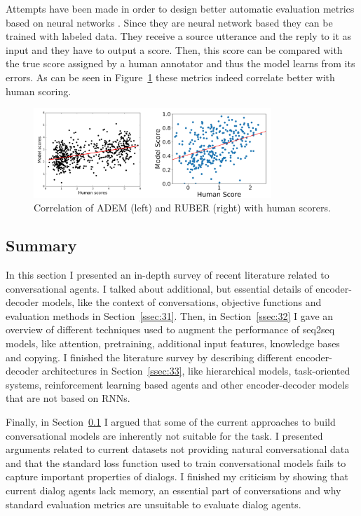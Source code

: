 \documentclass[12pt]{article}
\begin{document}
Attempts have been made in order to design better automatic evaluation metrics based on neural networks \cite{Tao:2017,Lowe:2017,Li_adversarial:2017}. Since they are neural network based they can be trained with labeled data. They receive a source utterance and the reply to it as input and they have to output a score. Then, this score can be compared with the true score assigned by a human annotator and thus the model learns from its errors. As can be seen in Figure~\ref{fig:adem_ruber} these metrics indeed correlate better with human scoring.
\begin{figure}[H]
	\centering
	\includegraphics[width=0.8\textwidth]{pics/adem_ruber.png}
	\caption{Correlation of ADEM (left) \cite{Lowe:2017} and RUBER (right) \cite{Tao:2017} with human scorers.}
	\label{fig:adem_ruber}
\end{figure}

\subsection{Summary} \label{ssec:summary}
In this section I presented an in-depth survey of recent literature related to conversational agents. I talked about additional, but essential details of encoder-decoder models, like the context of conversations, objective functions and evaluation methods in Section~\ref{ssec:31}. Then, in Section~\ref{ssec:32} I gave an overview of different techniques used to augment the performance of seq2seq models, like attention, pretraining, additional input features, knowledge bases and copying. I finished the literature survey by describing different encoder-decoder architectures in Section~\ref{ssec:33}, like hierarchical models, task-oriented systems, reinforcement learning based agents and other encoder-decoder models that are not based on RNNs.

Finally, in Section~\ref{ssec:summary} I argued that some of the current approaches to build conversational models are inherently not suitable for the task. I presented arguments related to current datasets not providing natural conversational data and that the standard loss function used to train conversational models fails to capture important properties of dialogs. I finished my criticism by showing that current dialog agents lack memory, an essential part of conversations and why standard evaluation metrics are unsuitable to evaluate dialog agents.
    
\end{document}
